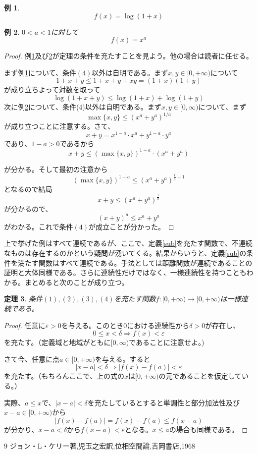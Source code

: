 \documentclass[leqno]{jsarticle}
\newtheorem{thm}{定理}
\newtheorem{exam}[thm]{例}
\newcommand{\To}{\Longrightarrow}
\newcommand{\mgn}{\infty}
\newcommand{\ep}{\varepsilon}
\begin{document}
\begin{exam}\label{log}
\[
f(x)=\log(1+x)
\]
\end{exam}

\begin{exam}\label{snow}
$0<a<1$に対して
\[
f(x)=x^a
\]
\end{exam}
\begin{proof}
例\ref{log}及び\ref{snow}が定理の条件を充たすことを見よう。他の場合は読者に任せる。\par
まず例\ref{log}について、条件$(4)$以外は自明である。まず$x,y\in [0,+\mgn)$について
\[
1+x+y\le 1+x+y+xy=(1+x)(1+y)
\]
が成り立ちよって対数を取って
\[
\log(1+x+y)\le \log(1+x)+\log(1+y)
\]
次に例\ref{snow}について、条件(4)以外は自明である。まず$x,y\in [0,\mgn)$について、まず
\[
\max\{x,y\}\le(x^a+y^a)^{1/a}
\]
が成り立つことに注意する。さて、
\[
x+y= x^{1-a}\cdot x^{a}+y^{1-a}\cdot y^a
\]
であり、$1-a>0$であるから
\[
x+y\le \left(\max\{x, y\}\right)^{1-a}\cdot(x^a+y^a)
\]

が分かる。そして最初の注意から
\[
\left(\max\{x, y\}\right)^{1-a}\le (x^a+y^a)^{\frac{1}{a}-1}
\]
となるので結局
\[
x+y\le (x^a+y^a)^{\frac{1}{a}}
\]
が分かるので、
\[
(x+y)^a\le x^a+y^a
\]
がわかる。これで条件$(4)$が成立ことが分かった。
\end{proof}

上で挙げた例はすべて連続であるが、ここで、定義\ref{sub}を充たす関数で、不連続なものは存在するのかという疑問が湧いてくる。結果からいうと、定義\ref{sub}の条件を満たす関数はすべて連続である。手法としては距離関数が連続であることの証明と大体同様である。さらに連続性だけではなく、一様連続性を持つこともわかる。まとめると次のことが成り立つ。
\begin{thm}
条件$(1),(2),(3),(4)$を充たす関数$f:[0,+\mgn)\to [0,+\mgn)$は一様連続である。
\end{thm}
\begin{proof}
任意に$\ep>0$を与える。このとき$0$における連続性から$\delta>0$が存在し、
\[
0\le x<\delta\To f(x)<\ep
\]
を充たす。（定義域と地域がともに$[0,\mgn)$であることに注意せよ。)\par
さて今、任意に点$a\in [0,+\mgn)$を与える。すると
\[
|x-a|<\delta\To |f(x)-f(a)|<\ep
\]
を充たす。（もちろんここで、上の式の$x$は$[0,+\mgn)$の元であることを仮定している。）\par
実際、$a\le x$で、$|x-a|<\delta$を充たしているとすると単調性と部分加法性及び$x-a\in [0,+\mgn)$から
\[
|f(x)-f(a)|=f(x)-f(a)\le f(x-a)
\]
が分かり、$x-a<\delta$から$f(x-a)<\ep$となる。$x\le a$の場合も同様である。
\end{proof}



	
\begin{thebibliography}{9}
ジョン・L・ケリー著,児玉之宏訳,位相空間論,吉岡書店,1968
\end{thebibliography}




			
\end{document}
